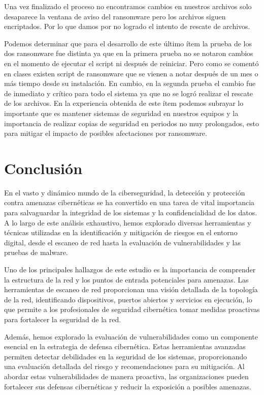 \documentclass[stu, 11pt, letterpaper, donotrepeattitle, floatsintext, natbib]{apa7}
\begin{document}
Una vez finalizado el proceso no encontramos cambios en nuestros archivos solo desaparece la ventana de aviso del ransomware pero los archivos siguen encriptados. Por lo que damos por no logrado el intento de rescate de archivos.

Podemos determinar que para el desarrollo de este último ítem la prueba de los dos ransomware fue distinta ya que en la primera prueba no se notaron cambios en el momento de ejecutar el script ni después de reiniciar. Pero como se comentó en clases existen script de ransomware que se vienen a notar después de un mes o más tiempo desde su instalación. En cambio, en la segunda prueba el cambio fue de inmediato y crítico para todo el sistema ya que no se logró realizar el rescate de los archivos. En la experiencia obtenida de este ítem podemos subrayar lo importante que es mantener sistemas de seguridad en nuestros equipos y la importancia de realizar copias de seguridad en periodos no muy prolongados, esto para mitigar el impacto de posibles afectaciones por ransomware.


\newpage

\section{\large Conclusión}

En el vasto y dinámico mundo de la ciberseguridad, la detección y protección contra amenazas cibernéticas se ha convertido en una tarea de vital importancia para salvaguardar la integridad de los sistemas y la confidencialidad de los datos. A lo largo de este análisis exhaustivo, hemos explorado diversas herramientas y técnicas utilizadas en la identificación y mitigación de riesgos en el entorno digital, desde el escaneo de red hasta la evaluación de vulnerabilidades y las pruebas de malware.

Uno de los principales hallazgos de este estudio es la importancia de comprender la estructura de la red y los puntos de entrada potenciales para amenazas. Las herramientas de escaneo de red proporcionan una visión detallada de la topología de la red, identificando dispositivos, puertos abiertos y servicios en ejecución, lo que permite a los profesionales de seguridad cibernética tomar medidas proactivas para fortalecer la seguridad de la red.

Además, hemos explorado la evaluación de vulnerabilidades como un componente esencial en la estrategia de defensa cibernética. Estas herramientas avanzadas permiten detectar debilidades en la seguridad de los sistemas, proporcionando una evaluación detallada del riesgo y recomendaciones para su mitigación. Al abordar estas vulnerabilidades de manera proactiva, las organizaciones pueden fortalecer sus defensas cibernéticas y reducir la exposición a posibles amenazas.
\end{document}
